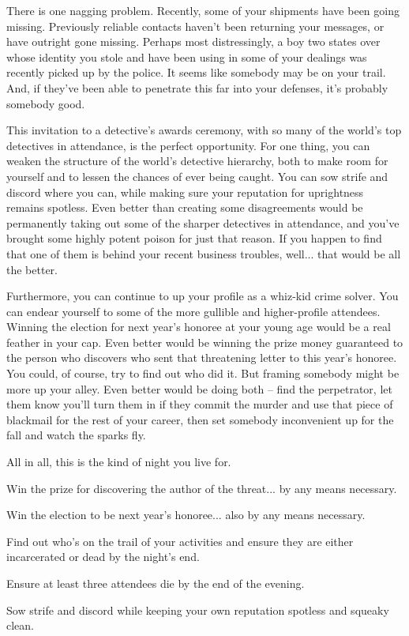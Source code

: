 \documentclass[char]{guildcamp4}
\begin{document}
There is one nagging problem. Recently, some of your shipments have been going missing. Previously reliable contacts haven't been returning your messages, or have outright gone missing. Perhaps most distressingly, a boy two states over whose identity you stole and have been using in some of your dealings was recently picked up by the police. It seems like somebody may be on your trail. And, if they've been able to penetrate this far into your defenses, it's probably somebody good.

This invitation to a detective's awards ceremony, with so many of the world's top detectives in attendance, is the perfect opportunity. For one thing, you can weaken the structure of the world's detective hierarchy, both to make room for yourself and to lessen the chances of ever being caught. You can sow strife and discord where you can, while making sure your reputation for uprightness remains spotless. Even better than creating some disagreements would be permanently taking out some of the sharper detectives in attendance, and you've brought some highly potent poison for just that reason. If you happen to find that one of them is behind your recent business troubles, well... that would be all the better.

Furthermore, you can continue to up your profile as a whiz-kid crime solver. You can endear yourself to some of the more gullible and higher-profile attendees. Winning the election for next year's honoree at your young age would be a real feather in your cap. Even better would be winning the prize money guaranteed to the person who discovers who sent that threatening letter to this year's honoree. You could, of course, try to find out who did it. But framing somebody might be more up your alley. Even better would be doing both -- find the perpetrator, let them know you'll turn them in if they commit the murder and use that piece of blackmail for the rest of your career, then set somebody inconvenient up for the fall and watch the sparks fly.

All in all, this is the kind of night you live for. 

\begin{itemz}[Goals]
	\item Win the prize for discovering the author of the threat... by any means necessary.
	\item Win the election to be next year's honoree... also by any means necessary.
	\item Find out who's on the trail of your activities and ensure they are either incarcerated or dead by the night's end.
	\item Ensure at least three attendees die by the end of the evening.
	\item Sow strife and discord while keeping your own reputation spotless and squeaky clean.
\end{itemz} 
\end{document}
